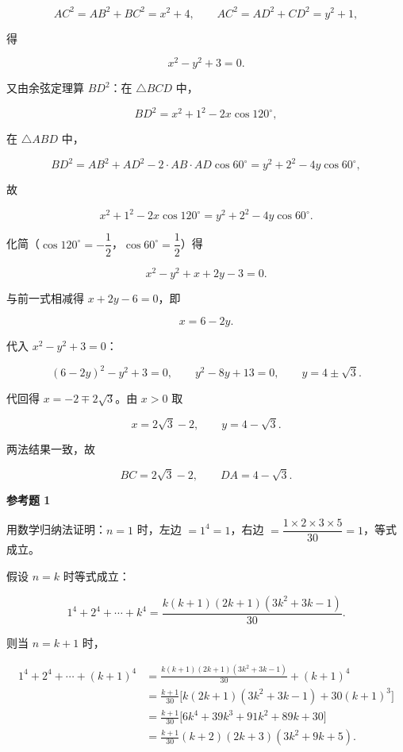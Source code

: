 \begin{answer}
\nopagebreak[4]
\[
AC^2=AB^2+BC^2=x^2+4,
\qquad
AC^2=AD^2+CD^2=y^2+1,
\]

得

\nopagebreak[4]
\[
x^2-y^2+3=0.
\]

又由余弦定理算 $BD^2$：在 $\triangle BCD$ 中，

\nopagebreak[4]
\[
BD^2=x^2+1^2-2x\cos120^\circ,
\]

在 $\triangle ABD$ 中，

\nopagebreak[4]
\[
BD^2=AB^2+AD^2-2\cdot AB\cdot AD\cos60^\circ
=y^2+2^2-4y\cos60^\circ,
\]

故

\nopagebreak[4]
\[
x^2+1^2-2x\cos120^\circ=y^2+2^2-4y\cos60^\circ.
\]

化简（$\cos120^\circ=-\dfrac12$，$\cos60^\circ=\dfrac12$）得

\nopagebreak[4]
\[
x^2-y^2+x+2y-3=0.
\]

与前一式相减得 $x+2y-6=0$，即

\nopagebreak[4]
\[
x=6-2y.
\]

代入 $x^2-y^2+3=0$：

\nopagebreak[4]
\[
(6-2y)^2-y^2+3=0,
\qquad
y^2-8y+13=0,
\qquad
y=4\pm\sqrt3.
\]

代回得 $x=-2\mp2\sqrt3$。由 $x>0$ 取

\nopagebreak[4]
\[
x=2\sqrt3-2,
\qquad
y=4-\sqrt3.
\]

两法结果一致，故

\nopagebreak[4]
\[
BC=2\sqrt3-2,
\qquad
DA=4-\sqrt3.
\]

\textbf{参考题 1}

用数学归纳法证明：$n=1$ 时，左边 $=1^4=1$，右边 $=\dfrac{1\times2\times3\times5}{30}=1$，等式成立。

假设 $n=k$ 时等式成立：

\nopagebreak[4]
\[
1^4+2^4+\cdots+k^4=\frac{k(k+1)(2k+1)(3k^2+3k-1)}{30}.
\]

则当 $n=k+1$ 时，

\nopagebreak[4]
\[
\begin{aligned}
1^4+2^4+\cdots+(k+1)^4
&=\frac{k(k+1)(2k+1)(3k^2+3k-1)}{30}+(k+1)^4\\
&=\frac{k+1}{30}\bigl[k(2k+1)(3k^2+3k-1)+30(k+1)^3\bigr]\\
&=\frac{k+1}{30}\bigl[6k^4+39k^3+91k^2+89k+30\bigr]\\
&=\frac{k+1}{30}(k+2)(2k+3)(3k^2+9k+5).
\end{aligned}
\]


\end{answer}
